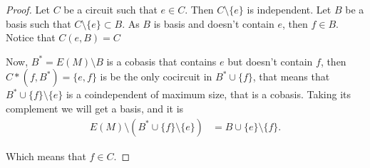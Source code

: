 \begin{proof}
        Let $C$ be a circuit such that $e \in C$. Then $C \setminus \{e\}$ is independent. Let $B$ be a basis such that 
        $C \setminus \{e\} \subset B$. As $B$ is basis and doesn't contain $e$, then $f \in B$. Notice that $C(e, B) = C$\pn 
        
        Now, $B^* = E(M) \setminus B$ is a cobasis that contains $e$ but doesn't contain $f$, then $C*(f, B^*) = \{e, f\}$ is be the
        only cocircuit in $B^* \cup \{f\}$, that means that $B^* \cup \{f\} \setminus \{e\}$ is a coindependent of maximum size, that is
        a cobasis. Taking its complement we will get a basis, and it is
        \begin{align}
                E(M) \setminus (B^* \cup \{f\} \setminus \{e\}) &= B \cup \{e\} \setminus \{ f \}.
        \end{align}
        
        Which means that $f \in C$.
\end{proof}